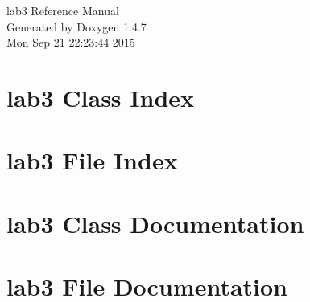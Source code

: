 \documentclass[a4paper]{book}
\begin{document}
\begin{titlepage}
\vspace*{7cm}
\begin{center}
{\Large lab3 Reference Manual}\\
\vspace*{1cm}
{\large Generated by Doxygen 1.4.7}\\
\vspace*{0.5cm}
{\small Mon Sep 21 22:23:44 2015}\\
\end{center}
\end{titlepage}
\clearemptydoublepage
{}
\tableofcontents
\clearemptydoublepage
{}
\chapter{lab3 Class Index}

\chapter{lab3 File Index}

\chapter{lab3 Class Documentation}

\chapter{lab3 File Documentation}





\printindex
\end{document}
